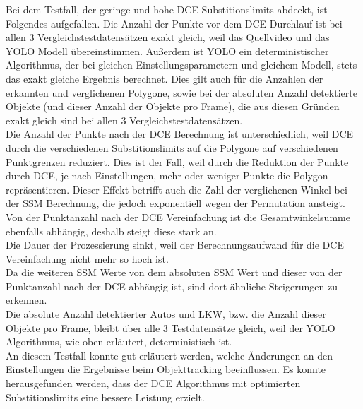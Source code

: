 {{		Bei dem Testfall, der geringe und hohe DCE Substitionslimits abdeckt, ist Folgendes aufgefallen. Die Anzahl der Punkte vor dem DCE Durchlauf ist bei allen 3 Vergleichstestdatensätzen exakt gleich, weil das Quellvideo und das YOLO Modell übereinstimmen. Außerdem ist YOLO ein deterministischer Algorithmus, der bei gleichen Einstellungsparametern und gleichem Modell, stets das exakt gleiche Ergebnis berechnet. Dies gilt auch für die Anzahlen der erkannten und verglichenen Polygone, sowie bei der absoluten Anzahl detektierte Objekte (und dieser Anzahl der Objekte pro Frame), die aus diesen Gründen exakt gleich sind bei allen 3 Vergleichstestdatensätzen. \\
		Die Anzahl der Punkte nach der DCE Berechnung ist unterschiedlich, weil DCE durch die verschiedenen Substitionslimits auf die Polygone auf verschiedenen Punktgrenzen reduziert. Dies ist der Fall, weil durch die Reduktion der Punkte durch DCE, je nach Einstellungen, mehr oder weniger Punkte die Polygon repräsentieren. Dieser Effekt betrifft auch die Zahl der verglichenen Winkel bei der SSM Berechnung, die jedoch exponentiell wegen der Permutation ansteigt. Von der Punktanzahl nach der DCE Vereinfachung ist die Gesamtwinkelsumme ebenfalls abhängig, deshalb steigt diese stark an. \\
		Die Dauer der Prozessierung sinkt, weil der Berechnungsaufwand für die DCE Vereinfachung nicht mehr so hoch ist. \\
		Da die weiteren SSM Werte von dem absoluten SSM Wert und dieser von der Punktanzahl nach der DCE abhängig ist, sind dort ähnliche Steigerungen zu erkennen. \\
		Die absolute Anzahl detektierter Autos und LKW, bzw. die Anzahl dieser Objekte pro Frame, bleibt über alle 3 Testdatensätze gleich, weil der YOLO Algorithmus, wie oben erläutert, deterministisch ist. \\
		An diesem Testfall konnte gut erläutert werden, welche Änderungen an den Einstellungen die Ergebnisse beim Objekttracking beeinflussen. Es konnte herausgefunden werden, dass der DCE Algorithmus mit optimierten Substitionslimits eine bessere Leistung erzielt. \\


}}
